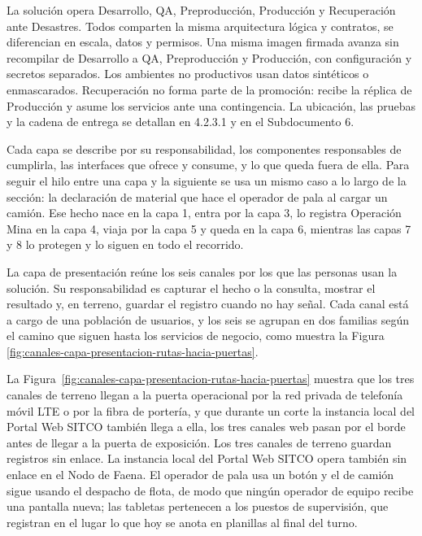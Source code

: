 \documentclass[subdoc]{../../comun/overfore}
\begin{document}
La solución opera Desarrollo, QA, Preproducción, Producción y Recuperación ante Desastres. Todos comparten la misma arquitectura lógica y contratos, se diferencian en escala, datos y permisos. Una misma imagen firmada avanza sin recompilar de Desarrollo a QA, Preproducción y Producción, con configuración y secretos separados. Los ambientes no productivos usan datos sintéticos o enmascarados. Recuperación no forma parte de la promoción: recibe la réplica de Producción y asume los servicios ante una contingencia. La ubicación, las pruebas y la cadena de entrega se detallan en 4.2.3.1 y en el Subdocumento 6.

Cada capa se describe por su responsabilidad, los componentes responsables de cumplirla, las interfaces que ofrece y consume, y lo que queda fuera de ella. Para seguir el hilo entre una capa y la siguiente se usa un mismo caso a lo largo de la sección: la declaración de material que hace el operador de pala al cargar un camión. Ese hecho nace en la capa 1, entra por la capa 3, lo registra Operación Mina en la capa 4, viaja por la capa 5 y queda en la capa 6, mientras las capas 7 y 8 lo protegen y lo siguen en todo el recorrido.

La capa de presentación reúne los seis canales por los que las personas usan la solución. Su responsabilidad es capturar el hecho o la consulta, mostrar el resultado y, en terreno, guardar el registro cuando no hay señal. Cada canal está a cargo de una población de usuarios, y los seis se agrupan en dos familias según el camino que siguen hasta los servicios de negocio, como muestra la Figura \ref{fig:canales-capa-presentacion-rutas-hacia-puertas}.

\begin{horizontal}
\end{horizontal}
La Figura~\ref{fig:canales-capa-presentacion-rutas-hacia-puertas} muestra que los tres canales de terreno llegan a la puerta operacional por la red privada de telefonía móvil LTE o por la fibra de portería, y que durante un corte la instancia local del Portal Web SITCO también llega a ella, los tres canales web pasan por el borde antes de llegar a la puerta de exposición. Los tres canales de terreno guardan registros sin enlace. La instancia local del Portal Web SITCO opera también sin enlace en el Nodo de Faena. El operador de pala usa un botón y el de camión sigue usando el despacho de flota, de modo que ningún operador de equipo recibe una pantalla nueva; las tabletas pertenecen a los puestos de supervisión, que registran en el lugar lo que hoy se anota en planillas al final del turno.
\end{document}

